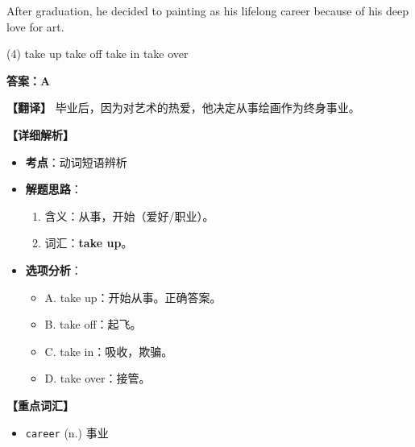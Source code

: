 \documentclass[11pt, a4paper]{article}
\newcommand{\analysis}[4]{
    \begin{solutionbox}
        \textbf{答案：#1}
        
        \textbf{【翻译】} #2
        
        \textbf{【详细解析】}
        #3
        
        \textbf{【重点词汇】}
        #4
    \end{solutionbox}
}
\newcommand{\blank}{\underline{\hspace{1.5cm}}}
\begin{document}
\begin{questions}
    \item After graduation, he decided to \blank painting as his lifelong career because of his deep love for art.
    \begin{tasks}(4)
        \task take up \task take off \task take in \task take over
    \end{tasks}
    \analysis{A}{毕业后，因为对艺术的热爱，他决定从事绘画作为终身事业。}{
        \begin{itemize}
            \item \textbf{考点}：动词短语辨析
            \item \textbf{解题思路}：
                \begin{enumerate}
                    \item 含义：从事，开始（爱好/职业）。
                    \item 词汇：\textbf{take up}。
                \end{enumerate}
            \item \textbf{选项分析}：
                \begin{itemize}
                    \item A. take up：开始从事。正确答案。
                    \item B. take off：起飞。
                    \item C. take in：吸收，欺骗。
                    \item D. take over：接管。
                \end{itemize}
        \end{itemize}
    }{
        \begin{itemize}
            \item \texttt{career} (n.) 事业
        \end{itemize}
    }


\end{questions}
\end{document}
